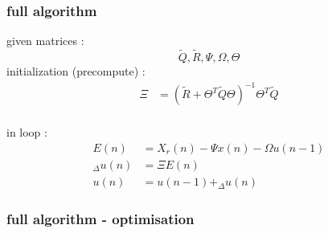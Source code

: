 \documentclass{beamer}
\begin{document}
\begin{frame}
  
  \frametitle{\bf full algorithm}
  given matrices : $$\tilde{Q}, \tilde{R}, \Psi, \Omega, \Theta$$
  initialization (precompute) :
  \begin{align*}
  \Xi &= (\tilde{R} + \Theta^T\tilde{Q}\Theta)^{-1} \Theta^T\tilde{Q} \\
  \end{align*}
  
  in loop :
  \begin{align*}
    E(n) &= X_r(n) - \Psi x(n) - \Omega u(n-1) \\
    _\Delta u(n) &= \Xi E(n) \\
    u(n) &= u(n-1) + _\Delta u(n)
  \end{align*}
\end{frame}




\begin{frame}
  
  \frametitle{\bf full algorithm - optimisation}

\end{frame}
\end{document}
